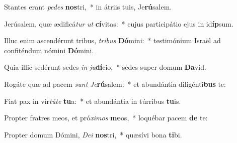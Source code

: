 \item Stantes erant \textit{pe}\textit{des} \textbf{nos}tri,~* in átriis tuis, Je\textbf{rú}salem.
\item Jerúsalem, quæ ædificá\textit{tur} \textit{ut} \textbf{cí}vitas:~* cujus participátio ejus in id\textbf{íp}sum.
\item Illuc enim ascendérunt tribus, \textit{tri}\textit{bus} \textbf{Dó}mini:~* testimónium Israël ad confiténdum nómini \textbf{Dó}mini.
\item Quia illic sedérunt sedes \textit{in} \textit{ju}\textbf{dí}cio,~* sedes super domum \textbf{Da}vid.
\item Rogáte quæ ad pacem \textit{sunt} \textit{Je}\textbf{rú}salem:~* et abundántia diligénti\textbf{bus} te:
\item Fiat pax in vir\textit{tú}\textit{te} \textbf{tu}a:~* et abundántia in túrribus \textbf{tu}is.
\item Propter fratres meos, et pró\textit{xi}\textit{mos} \textbf{me}os,~* loquébar pacem \textbf{de} te:
\item Propter domum Dómini, \textit{De}\textit{i} \textbf{nos}tri,~* quæsívi bona \textbf{ti}bi.
